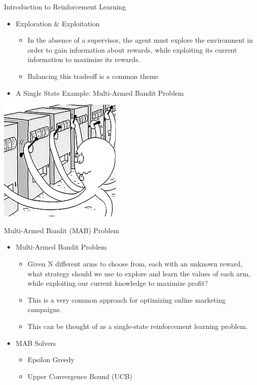 \documentclass{beamer}
\begin{document}
\begin{frame}[t]{Introduction to Reinforcement Learning} %
\begin{itemize}
\item Exploration \& Exploitation
	\begin{itemize}
	\item In the absence of a supervisor, the agent must explore the environment in order to gain information about rewards, while exploiting its current information to maximize its rewards.
	\item Balancing this tradeoff is a common theme
	\end{itemize}
\item A Single State Example: Multi-Armed Bandit Problem
\end{itemize}
\begin{center}
\includegraphics[scale=0.45]{multi}
\end{center}
\end{frame}

\begin{frame}[t]{Multi-Armed Bandit (MAB) Problem} %
\begin{itemize}
\item Multi-Armed Bandit Problem
	\begin{itemize}
	\item Given N different arms to choose from, each with an unknown reward, what strategy should we use to explore and learn the values of each arm, while exploiting our current knowledge to maximize profit?
	\item This is a very common approach for optimizing online marketing campaigns.
	\item This can be thought of as a single-state reinforcement learning problem.
	\end{itemize}
\item MAB Solvers
	\begin{itemize}
	\item Epsilon Greedy
	\item Upper Convergence Bound (UCB)
	\end{itemize}
\end{itemize}			
\end{frame}
\end{document}
